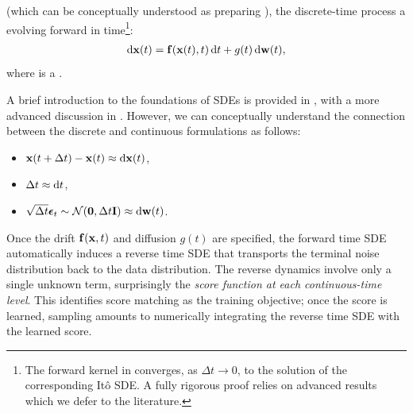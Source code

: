  (which can be conceptually understood as preparing  ), the discrete-time process  a  evolving forward in time\footnote{The forward kernel in  converges, as $\Delta t\to0$, to the solution of the corresponding Itô SDE. A fully rigorous proof relies on advanced results which we defer to the literature.}:
\begin{align*}
    \mathop{}\!\mathrm{d} {\mathbf{x}}(t) = {\mathbf{f}}({\mathbf{x}}(t), t) \mathop{}\!\mathrm{d} t + g(t) \mathop{}\!\mathrm{d} {\mathbf{w}}(t),
\end{align*}
where  is a .

A brief introduction to the foundations of SDEs is provided in , with a more advanced discussion in . However, we can conceptually understand the connection between the discrete and continuous formulations as follows:
\begin{itemize}
    \item ${\mathbf{x}}(t+\Delta t) - {\mathbf{x}}(t) \approx \mathop{}\!\mathrm{d} {\mathbf{x}}(t)$,
    \item $\Delta t \approx \mathop{}\!\mathrm{d} t$,
    \item $\sqrt{\Delta t} \bm{\epsilon}_t \sim \mathcal{N}(\bm{0}, \Delta t {\mathbf{I}}) \approx \mathop{}\!\mathrm{d} {\mathbf{w}}(t)$.
\end{itemize}
Once the drift ${\mathbf{f}}({\mathbf{x}},t)$ and diffusion $g(t)$ are specified, the forward time SDE automatically induces a reverse time SDE that transports the terminal noise distribution back to the data distribution. The reverse dynamics involve only a single unknown term, surprisingly the \emph{score function at each continuous-time level}. This identifies score matching as the training objective; once the score is learned, sampling amounts to numerically integrating the reverse time SDE with the learned score.


